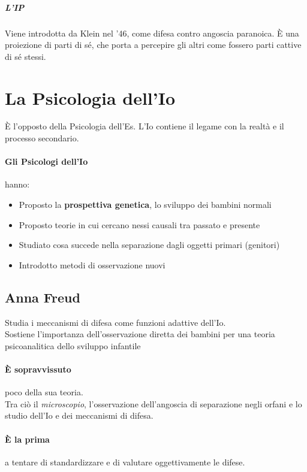 \documentclass[12pt, a4paper]{article}
\begin{document}
\subparagraph{L'IP} Viene introdotta da Klein nel '46, come difesa contro angoscia paranoica. \`E una proiezione di parti di s\'e, che porta a percepire gli altri come fossero parti cattive di s\'e stessi.


\section{La Psicologia dell'Io}

\`E l'opposto della Psicologia dell'Es. L'Io contiene il legame con la realt\`a e il processo secondario.

\paragraph{Gli Psicologi dell'Io} hanno:
\begin{itemize}
    \item Proposto la \textbf{prospettiva genetica}, lo sviluppo dei bambini normali
    \item Proposto teorie in cui cercano nessi causali tra passato e presente
    \item Studiato cosa succede nella separazione dagli oggetti primari (genitori)
    \item Introdotto metodi di osservazione nuovi
\end{itemize}

\subsection{Anna Freud}

Studia i meccanismi di difesa come funzioni adattive dell'Io. \\
Sostiene l'importanza dell'osservazione diretta dei bambini per una teoria psicoanalitica dello sviluppo infantile

\paragraph{\`E sopravvissuto} poco della sua teoria. \\ Tra ciò il \emph{microscopio}, l'osservazione dell'angoscia di separazione negli orfani e lo studio dell'Io e dei meccanismi di difesa.

\paragraph{\`E la prima} a tentare di standardizzare e di valutare oggettivamente le difese.
\end{document}

